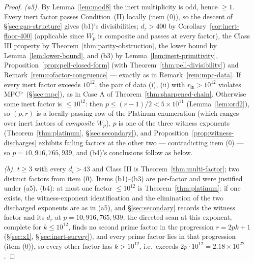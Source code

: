\documentclass[11pt]{amsart}
\theoremstyle{plain}
\theoremstyle{definition}
\theoremstyle{remark}
\numberwithin{equation}{section}
\begin{document}
\begin{proof}
\emph{(a5).} By Lemma~\ref{lem:mod8} the inert multiplicity is odd,
hence $\geq 1$. Every inert factor passes Condition~(II) locally (item
(0)), so the descent of \S\ref{sec:gap-structure} gives (b1)'s
divisibilities; $d_r > 400$ by Corollary~\ref{cor:inert-floor-400}
(applicable since $W_p$ is composite and passes at every factor), the Class
III property by Theorem~\ref{thm:parity-obstruction}, the lower bound by
Lemma~\ref{lem:lower-bound}, and (b3) by
Lemma~\ref{lem:inert-primitivity},
Proposition~\ref{prop:pell-closed-form} (with
Theorem~\ref{thm:pell-divisibility}) and
Remark~\ref{rem:cofactor-congruence} --- exactly as in
Remark~\ref{rem:mpc-data}. If every inert factor exceeds $10^{12}$, the
pair of data (i), (ii) with $r_{\mathrm{in}} > 10^{12}$ violates
MPC$^{>}$ (\S\ref{sec:mpc}), as in Case A of
Theorem~\ref{thm:sharpened-chain}. Otherwise some inert factor is
$\leq 10^{12}$: then $p \leq (r-1)/2 < 5 \times 10^{11}$
(Lemma~\ref{lem:ord2}), so $(p, r)$ is a locally passing row of the
Platinum enumeration (which ranges over inert factors of
\emph{composite} $W_p$), $p$ is one of the three witness exponents
(Theorem~\ref{thm:platinum}, \S\ref{sec:secondary}), and
Proposition~\ref{prop:witness-discharges} exhibits failing factors at
the other two --- contradicting item (0) --- so
$p = 10{,}916{,}765{,}939$, and (b4)'s conclusions follow as below.

\emph{(b).} $t \geq 3$ with every $d_i > 43$ and Class III is
Theorem~\ref{thm:multi-factor}; two distinct factors from item (0).
Items (b1)--(b3) are per-factor and were justified under (a5). (b4): at
most one factor $\leq 10^{12}$ is Theorem~\ref{thm:platinum}; if one
exists, the witness-exponent identification and the elimination of the
two discharged exponents are as in (a5), and \S\ref{sec:secondary}
records the witness factor and its $d_r$ at
$p = 10{,}916{,}765{,}939$; the directed scan at this exponent, complete
for $k \leq 10^{12}$, finds no second prime factor in the progression
$r = 2 p k + 1$ (\S\ref{sec:x1}, \S\ref{sec:inert-survey}), and every
prime factor lies in that progression (item (0)), so every other factor
has $k > 10^{12}$, i.e.\ exceeds $2 p \cdot 10^{12} = 2.18 \times
10^{22}$.


\end{proof}
\end{document}

